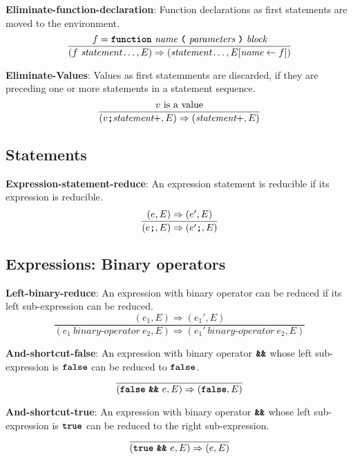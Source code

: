 \vspace{10mm}

\textbf{Eliminate-function-declaration}: Function declarations as first
statements are moved to the environment.
\[
\frac{
             f = \textbf{\texttt{function}}\  \textit{name}
                 \ \textbf{\texttt{(}}\  \textit{parameters}
                 \ \textbf{\texttt{)}}\ \textit{block}
}{
( f\ \textit{statement} \ldots, E)
  \Rightarrow
  ( \textit{statement} \ldots, E[\textit{name} \leftarrow f])
}
\]

\vspace{10mm}
\textbf{Eliminate-Values}: Values as first statemments are discarded, if
they are preceding one or more statements in a statement sequence.
\[
\frac{
v \ \mbox{is a value}
}{
(v \textbf{\texttt{;}} \textit{statement}+, E)
   \Rightarrow
  ( \textit{statement}+, E)
}
\]

\subsection*{Statements}

\textbf{Expression-statement-reduce}: An expression statement
is reducible if its expression is reducible.
\[
\frac{
  (e,E) \Rightarrow (e',E)
}{
  (e \textbf{\texttt{;}}, E)
  \Rightarrow
  (e' \textbf{\texttt{;}}, E)
}
\]

\subsection*{Expressions: Binary operators}

\textbf{Left-binary-reduce}: An expression with binary operator
can be reduced if its left sub-expression can be reduced.
\[
\frac{
  ( e_1 , E ) \Rightarrow (e_1', E)
}{
  (e_1\  \textit{binary-operator} \ e_2, E)
  \Rightarrow
  (e_1'\  \textit{binary-operator} \ e_2, E)
}
\]


\vspace{10mm}
\textbf{And-shortcut-false}: An expression with binary operator
$\textbf{\texttt{\&\&}}$ whose left sub-expression is
$\textbf{\texttt{false}}$ can be reduced to
$\textbf{\texttt{false}}$.
\[
\frac{
}{
  (\textbf{\texttt{false}}\  \textbf{\texttt{\&\&}}\ e, E)
  \Rightarrow
  (\textbf{\texttt{false}}, E)
}
\]

\vspace{10mm}
\textbf{And-shortcut-true}: An expression with binary operator
$\textbf{\texttt{\&\&}}$ whose left sub-expression is
$\textbf{\texttt{true}}$ can be reduced to
the right sub-expression.
\[
\frac{
}{
  (\textbf{\texttt{true}}\  \textbf{\texttt{\&\&}}\ e, E)
  \Rightarrow
  (e, E)
}
\]

